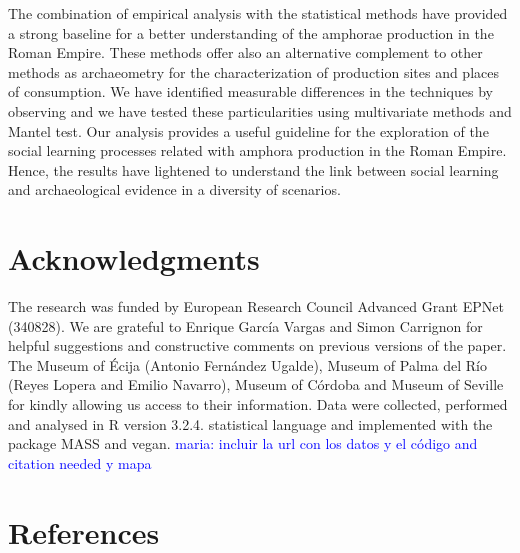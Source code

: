 \documentclass[review]{elsarticle}
\newcommand{\memo}[2]{\textcolor{#1}{#2}}
\newcommand{\maria}[1]{\memo{blue}{maria: #1\\}}
\begin{document}
The combination of empirical analysis with the statistical methods have provided a strong baseline for a better understanding of the amphorae production in the Roman Empire. These methods offer also an alternative complement to other methods as archaeometry for the characterization of production sites and places of consumption. We have identified measurable differences in the techniques by observing and we have tested these particularities using multivariate methods and Mantel test. Our analysis provides a useful guideline for the exploration of the social learning processes related with amphora production in the Roman Empire. Hence, the results have lightened to understand the link between social learning and archaeological evidence in a diversity of scenarios. 

\section{Acknowledgments}

The research was funded by European Research Council Advanced Grant EPNet (340828). We are grateful to Enrique Garc\'ia Vargas and Simon Carrignon for helpful suggestions and constructive comments on previous versions of the paper. The Museum of \'Ecija (Antonio Fern\'andez Ugalde), Museum of Palma del R\'io (Reyes Lopera and Emilio Navarro), Museum of C\'ordoba and Museum of Seville for kindly allowing us access to their information.  
Data were collected, performed and analysed in R version 3.2.4. statistical language and implemented with the package MASS and vegan.
\maria{incluir la url con los datos y el código and citation needed y mapa}


\section*{References}

%

\end{document}

